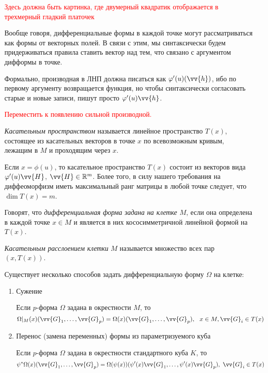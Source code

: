\textcolor{red}{Здесь должна быть картинка, где двумерный квадратик отображается в трехмерный гладкий платочек}

\begin{note}
	Вообще говоря, дифференциальные формы в каждой точке могут рассматриваться как формы от векторных полей. В связи с этим, мы синтаксически будем придерживаться правила ставить вектор над тем, что связано с аргументом дифформы в точке.
\end{note}

\begin{reminder}
	Формально, производная в ЛНП должна писаться как $\phi'(u)(\vv{h})$, ибо по первому аргументу возвращается функция, но чтобы синтаксически согласовать старые и новые записи, пишут просто $\phi'(u)\vv{h}$.
	
	\textcolor{red}{Переместить к появлению сильной производной.}
\end{reminder}

\begin{definition}
	\textit{Касательным пространством} называется линейное пространство $T(x)$, состоящее из касательных векторов в точке $x$ по всевозможным кривым, лежащим в $M$ и проходящим через $x$.
\end{definition}

\begin{note}
	Если $x = \phi(u)$, то касательное пространство $T(x)$ состоит из векторов вида $\phi'(u)\vv{H}$, $\vv{H} \in \R^m$. Более того, в силу нашего требования на диффеоморфизм иметь максимальный ранг матрицы в любой точке следует, что $\dim T(x) = m$.
\end{note}

\begin{definition}
	Говорят, что \textit{дифференциальная форма задана на клетке $M$}, если она определена в каждой точке $x \in M$ и является в них кососимметричной линейной формой на $T(x)$.
\end{definition}

\begin{definition}
	\textit{Касательным расслоением клетки} $M$ называется множество всех пар $(x, T(x))$.
\end{definition}

\begin{note}
	Существует несколько способов задать дифференциальную форму $\Omega$ на клетке:
	\begin{enumerate}
		\item Сужение
		
		Если $p$-форма $\Omega$ задана в окрестности $M$, то
		\[
			\Omega|_M(x)(\vv{G}_1, \ldots, \vv{G}_p) = \Omega(x)(\vv{G}_1, \ldots, \vv{G}_p),\ \ x \in M, \vv{G}_i \in T(x)
		\]
		
		\item Перенос (замена переменных) формы из параметризуемого куба
		
		Если $p$-форма $\Omega$ задана в окрестности стандартного куба $K$, то
		\[
			\psi^*\Omega(x)(\vv{G}_1, \ldots, \vv{G}_p) = \Omega(\psi(x))(\psi'(x)\vv{G}_1, \ldots, \psi'(x)\vv{G}_p),\ \vv{G}_i \in T(x)
		\]
	\end{enumerate}
\end{note}

